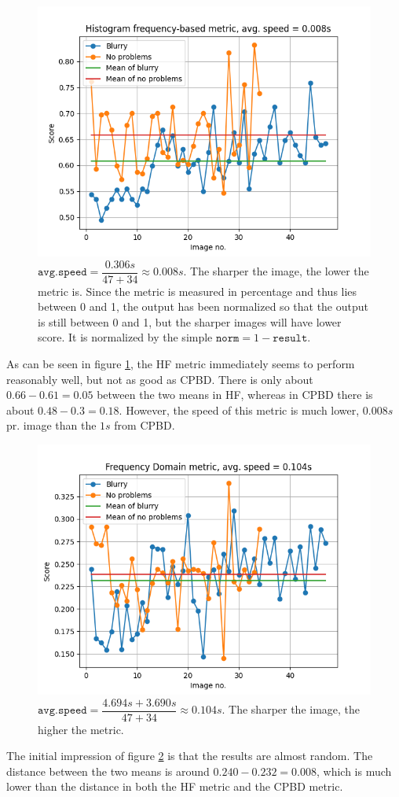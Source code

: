\begin{figure}[H]
    \centering
    \includegraphics[width=.8\textwidth]{Figures/BlurredImages/output_HF.png}
    \caption{$\texttt{avg.speed} = \dfrac{0.306\si{s}}{47+34} \approx 0.008\si{s}$. The sharper the image, the lower the metric is. Since the metric is measured in percentage and thus lies between 0 and 1, the output has been normalized so that the output is still between 0 and 1, but the sharper images will have lower score. It is normalized by the simple $\texttt{norm}=1-\texttt{result}$.}
    \label{fig:HF}
\end{figure}
As can be seen in figure \ref{fig:HF}, the HF metric immediately seems to perform reasonably well, but not as good as CPBD. There is only about $0.66-0.61=0.05$ between the two means in HF, whereas in CPBD there is about $0.48-0.3=0.18$. However, the speed of this metric is much lower, $0.008\si{s}$ pr. image than the $1\si{s}$ from CPBD.

\begin{figure}[H]
    \centering
    \includegraphics[width=.8\textwidth]{Figures/BlurredImages/output_FM.png}
    \caption{$\texttt{avg.speed} = \dfrac{4.694\si{s}+3.690\si{s}}{47+34} \approx 0.104\si{s}$. The sharper the image, the higher the metric.}
    \label{fig:FM}
\end{figure}
The initial impression of figure \ref{fig:FM} is that the results are almost random. The distance between the two means is around $0.240-0.232=0.008$, which is much lower than the distance in both the HF metric and the CPBD metric.\\

